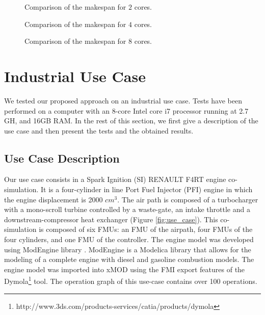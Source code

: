 \begin{figure}[phbt]
\centering

\caption{Comparison of the makespan for $2$ cores.}
\label{fig:sched_mkspan_2}
\end{figure}

\begin{figure}[phbt]
\centering

\caption{Comparison of the makespan for $4$ cores.}
\label{fig:sched_mkspan_4}
\end{figure}

\begin{figure}[phbt]
\centering

\caption{Comparison of the makespan for $8$ cores.}
\label{fig:sched_mkspan_8}
\end{figure} 

%

\section{Industrial Use Case} 

We tested our proposed approach on an industrial use case. Tests have been performed on a computer with an 8-core Intel core i7 processor running at 2.7 GH, and 16GB RAM. In the rest of this section, we first give a description of the use case and then present the tests and the obtained results.

\subsection{Use Case Description}

Our use case consists in a Spark Ignition (SI) RENAULT F4RT engine co-simulation. It is a four-cylinder in line Port Fuel Injector (PFI) engine in which the engine displacement is 2000 $cm^3$. The air path is composed of a turbocharger with a mono-scroll turbine controlled by a waste-gate, an intake throttle and a downstream-compressor heat exchanger (Figure \ref{fig:use_case}). This co-simulation is composed of six FMUs: an FMU of the airpath, four FMUs of the four cylinders, and one FMU of the controller.
The engine model was developed using ModEngine library \cite{benjelloun:2011}. ModEngine is a Modelica library that allows for the modeling of a complete engine with diesel and gasoline combustion models. The engine model was imported into xMOD using the FMI export features of the Dymola\footnote{http://www.3ds.com/products-services/catia/products/dymola} tool. The operation graph of this use-case contains over 100 operations.

